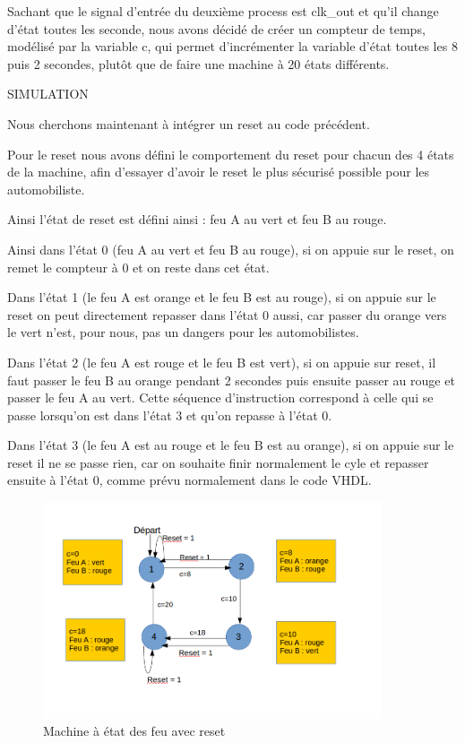 \documentclass[11pt]{report}
\begin{document}
Sachant que le signal d'entrée du deuxième process est clk\_out et qu'il change d'état toutes les seconde, nous avons décidé de créer un compteur de temps, modélisé par la variable c, qui permet d'incrémenter la variable d'état toutes les 8 puis 2 secondes, plutôt que de faire une machine à 20 états différents.

SIMULATION

\bigskip

Nous cherchons maintenant à intégrer un reset au code précédent.

Pour le reset nous avons défini le comportement du reset pour chacun des 4 états de la machine, afin d'essayer d'avoir le reset le plus sécurisé possible pour les automobiliste.

Ainsi l'état de reset est défini ainsi : feu A au vert et feu B au rouge.

Ainsi dans l'état 0 (feu A au vert et feu B au rouge), si on appuie sur le reset, on remet le compteur à 0 et on reste dans cet état.

Dans l'état 1 (le feu A est orange et le feu B est au rouge), si on appuie sur le reset on peut directement repasser dans l'état 0 aussi, car passer du orange vers le vert n'est, pour nous, pas un dangers pour les automobilistes.

Dans l'état 2 (le feu A est rouge et le feu B est vert), si on appuie sur reset, il faut passer le feu B au orange pendant 2 secondes puis ensuite passer au rouge et passer le feu A au vert. Cette séquence d'instruction correspond à celle qui se passe lorsqu'on est dans l'état 3 et qu'on repasse à l'état 0.

Dans l'état 3 (le feu A est au rouge et le feu B est au orange), si on appuie sur le reset il ne se passe rien, car on souhaite finir normalement le cyle et repasser ensuite à l'état 0, comme prévu normalement dans le code VHDL.

\begin{figure}[h]
\includegraphics[width=10cm]{TP03-2 .png}
\caption{Machine à état des feu avec reset}
\end{figure}
\end{document}
